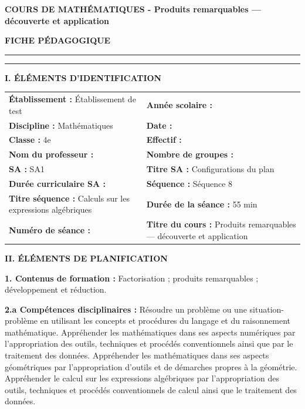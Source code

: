 \documentclass[10pt,a4paper]{article}
\begin{document}
\begin{center}
{\large\bfseries COURS DE MATHÉMATIQUES - Produits remarquables — découverte et application}
\end{center}

\begin{center}\textbf{FICHE PÉDAGOGIQUE}\end{center}
\hrule\vspace{2pt}\hrule\smallskip
\begin{center}\textbf{I. ÉLÉMENTS D'IDENTIFICATION}\end{center}
\small\begin{tabularx}{\linewidth}{@{}X X@{}}
\textbf{Établissement :} Établissement de test & \textbf{Année scolaire :}  \\
\textbf{Discipline :} Mathématiques & \textbf{Date :}  \\
\textbf{Classe :} 4e & \textbf{Effectif :}  \\
\textbf{Nom du professeur :}  & \textbf{Nombre de groupes :}  \\
\textbf{SA :} SA1 & \textbf{Titre SA :} Configurations du plan \\
\textbf{Durée curriculaire SA :}  & \textbf{Séquence :} Séquence 8 \\
\textbf{Titre séquence :} Calculs sur les expressions algébriques & \textbf{Durée de la séance :} 55 min \\
\textbf{Numéro de séance :}  & \textbf{Titre du cours :} Produits remarquables — découverte et application \\
\end{tabularx}
\begin{center}\textbf{II. ÉLÉMENTS DE PLANIFICATION}\end{center}
\textbf{1. Contenus de formation :} Factorisation ; produits remarquables ; développement et réduction.\par
\textbf{2.a Compétences disciplinaires :} Résoudre un problème ou une situation-problème en utilisant les concepts et procédures du langage et du raisonnement mathématique.
Appréhender les mathématiques dans ses aspects numériques par l’appropriation des outils, techniques et procédés conventionnels ainsi que par le traitement des données.
Appréhender les mathématiques dans ses aspects géométriques par l’appropriation d’outils et de démarches propres à la géométrie.
Appréhender le calcul sur les expressions algébriques par l’appropriation des outils, techniques et procédés conventionnels de calcul ainsi que le traitement des données.\par
\end{document}

